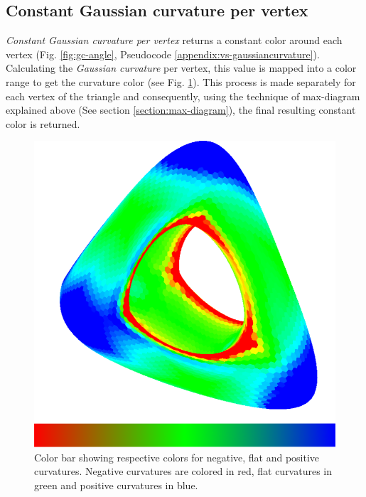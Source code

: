 
\subsection{Constant Gaussian curvature per vertex}
\textit{Constant Gaussian curvature per vertex} returns a constant color around each vertex (Fig. \ref{fig:gc-angle}, Pseudocode \ref{appendix:vs-gaussiancurvature}). Calculating the \textit{Gaussian curvature} per vertex, this value is mapped into a color range to get the curvature color (see Fig. \ref{fig:color-range-curvature}). This process is made separately for each vertex of the triangle and consequently, using the technique of max-diagram explained above (See section \ref{section:max-diagram}), the final resulting constant color is returned.
\begin{figure}[!h]
    \centering
    \includegraphics[scale=1.2]{images/gradient-curvature.png}
    \caption{Color bar showing respective colors for negative, flat and positive curvatures. Negative curvatures are colored in red, flat curvatures in green and positive curvatures in blue.} \label{fig:color-range-curvature}
\end{figure}


